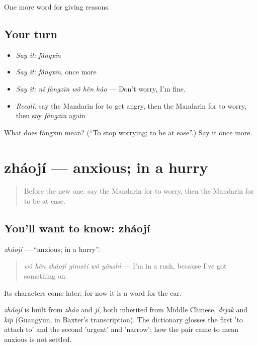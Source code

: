 \begin{grammarlens}[title={What you've built}]
One more word for giving reasons.
\end{grammarlens}

\subsection*{Your turn}
\begin{itemize}
\raggedright
  \item \emph{Say it:} \emph{fàngxīn}
  \item \emph{Say it:} \emph{fàngxīn}, once more
  \item \emph{Say it:} \emph{nǐ fàngxīn wǒ hěn hǎo} — Don't worry, I'm fine.
  \item \emph{Recall:} say the Mandarin for to get angry, then the Mandarin for to worry, then say \emph{fàngxīn} again
\end{itemize}

\begin{tcolorbox}[breakable,colback=teal!4,colframe=teal!35!black,title={Before you move on}]
What does fàngxīn mean? (\textquotedblleft{}To stop worrying; to be at ease\textquotedblright{}.) Say it once more.
\end{tcolorbox}
\section[zháojí]{zháojí — anxious; in a hurry}

\label{lesson:ZH-C125-zhaoji}



\begin{quote}
Before the new one: say the Mandarin for to worry, then the Mandarin for to be at ease.
\end{quote}

\subsection*{You'll want to know: zháojí}
\emph{zháojí} — \textquotedblleft{}anxious; in a hurry\textquotedblright{}.

\begin{quote}
\emph{wǒ hěn zháojí yīnwèi wǒ yǒushì} — I'm in a rush, because I've got something on.
\end{quote}

Its characters come later; for now it is a word for the ear.

\begin{cousinweb}
\emph{zháojí} is built from \emph{zháo} and \emph{jí}, both inherited from Middle Chinese, \emph{drjak} and \emph{kip} (Guangyun, in Baxter's transcription). The dictionary glosses the first 'to attach to' and the second 'urgent' and 'narrow'; how the pair came to mean anxious is not settled.
\end{cousinweb}

